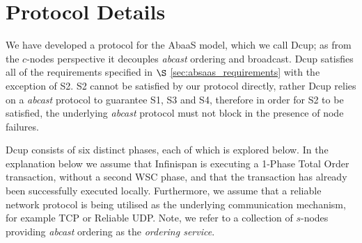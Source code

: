 \section{Protocol Details}\label{sec:decoupled_protocol}
We have developed a protocol for the \textsf{AbaaS} model, which we call \textsf{Dcup}; as from the $c$-nodes perspective it decouples \emph{abcast} ordering and broadcast.  \textsf{Dcup} satisfies all of the requirements specified in $\S$ \ref{sec:absaas_requirements} with the exception of S2.  S2 cannot be satisfied by our protocol directly, rather \textsf{Dcup} relies on a \emph{abcast} protocol to guarantee S1, S3 and S4, therefore in order for S2 to be satisfied, the underlying \emph{abcast} protocol must not block in the presence of node failures.  

\textsf{Dcup} consists of six distinct phases, each of which is explored below.  In the explanation below we assume that Infinispan is executing a 1-Phase Total Order transaction, without a second WSC phase, and that the transaction has already been successfully executed locally.  Furthermore, we assume that a reliable network protocol is being utilised as the underlying communication mechanism, for example TCP\citep{Cerf:2005:PPN:1064413.1064423} or Reliable UDP\citep{ReliableUDP}.  Note, we refer to a collection of $s$-nodes providing \emph{abcast} ordering as the \emph{ordering service}.  

